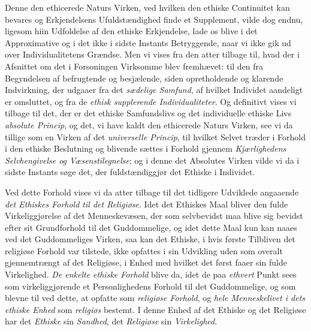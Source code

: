 Denne den ethicerede Naturs Virken, ved hvilken den ethiske Continuitet kan
bevares og Erkjendelsens Ufuldstændighed finde et Supplement, vilde dog endnu,
ligesom hiin Udfoldelse af den ethiske Erkjendelse, lade os blive i det
Approximative og i det ikke i sidste Instants Betryggende, naar vi ikke gik ud
over Individualitetens Grændse. Men vi vises fra den atter tilbage til, hvad der i
Afsnittet om det i Forsoningen Virksomme blev fremhævet: til den fra Begyndelsen
af befrugtende og besjælende, siden opretholdende og klarende Indvirkning, der
udgaaer fra det \emph{sædelige Samfund}, af hvilket Individet aandeligt er
omsluttet, og fra de \emph{ethisk supplerende Individualiteter}. Og definitivt
vises vi tilbage til det, der er det ethiske Samfundslivs og det individuelle
ethiske Livs \emph{absolute Princip}, og det, vi have kaldt den ethicerede Naturs
Virken, see vi da tillige som en Virken af det \emph{universelle Princip},
 til hvilket Selvet træder i Forhold i den ethiske Beslutning og blivende sættes i
Forhold gjennem \emph{Kjærlighedens Selvhengivelse og Væsenstilegnelse}; og i
denne det Absolutes Virken vilde vi da i sidste Instants søge det, der
fuldstændiggjør det Ethiske i Individet.

Ved dette Forhold vises vi da atter tilbage til det tidligere Udviklede angaaende
\emph{det Ethiskes Forhold til det Religiøse}. Idet det Ethiskes Maal bliver den
fulde Virkeliggjørelse af det Menneskevæsen, der som selvbevidst maa blive sig
bevidst efter sit Grundforhold til det Guddommelige, og idet dette Maal kun kan
naaes ved det Guddommeliges Virken, saa kan det Ethiske, i hvis første Tilbliven
det religiøse Forhold var tilstede, ikke opfattes i sin Udvikling uden som overalt
gjennemtrængt af det Religiøse, i Enhed med hvilket det først faaer sin fulde
Virkelighed. \emph{De enkelte ethiske Forhold} blive da, idet de paa
\emph{ethvert} Punkt sees som virkeliggjørende et Personlighedens Forhold til det
Guddommelige, og som blevne til ved dette, at opfatte som \emph{religiøse
Forhold}, og \emph{hele Menneskelivet i dets ethiske Enhed} som \emph{religiøs}
bestemt. I denne Enhed af det Ethiske og det Religiøse har det \emph{Ethiske} sin
\emph{Sandhed}, det \emph{Religiøse} sin \emph{Virkelighed}.

